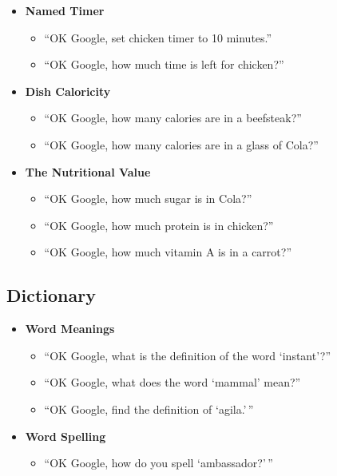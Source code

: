 \documentclass[
  jou,
  floatsintext,
  longtable,
  a4paper,
  nolmodern,
  notxfonts,
  notimes,
  12pt,
  colorlinks=true,linkcolor=blue,citecolor=blue,urlcolor=blue]{apa7}
\providecommand{\tightlist}{%
  \setlength{\itemsep}{0pt}\setlength{\parskip}{0pt}}
\begin{document}
\begin{itemize}
\tightlist
\item
  \textbf{Named Timer}

  \begin{itemize}
  \tightlist
  \item
    ``OK Google, set chicken timer to 10 minutes.''
  \item
    ``OK Google, how much time is left for chicken?''
  \end{itemize}
\item
  \textbf{Dish Caloricity}

  \begin{itemize}
  \tightlist
  \item
    ``OK Google, how many calories are in a beefsteak?''
  \item
    ``OK Google, how many calories are in a glass of Cola?''
  \end{itemize}
\item
  \textbf{The Nutritional Value}

  \begin{itemize}
  \tightlist
  \item
    ``OK Google, how much sugar is in Cola?''
  \item
    ``OK Google, how much protein is in chicken?''
  \item
    ``OK Google, how much vitamin A is in a carrot?''
  \end{itemize}
\end{itemize}

\subsection{Dictionary}\label{dictionary}

\begin{itemize}
\tightlist
\item
  \textbf{Word Meanings}

  \begin{itemize}
  \tightlist
  \item
    ``OK Google, what is the definition of the word `instant'?''
  \item
    ``OK Google, what does the word `mammal' mean?''
  \item
    ``OK Google, find the definition of `agila.'\,''
  \end{itemize}
\item
  \textbf{Word Spelling}

  \begin{itemize}
  \tightlist
  \item
    ``OK Google, how do you spell `ambassador?'\,''
  \end{itemize}
\end{itemize}
\end{document}

